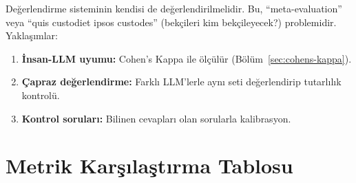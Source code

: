 De\u{g}erlendirme sisteminin kendisi de de\u{g}erlendirilmelidir. Bu, ``meta-evaluation'' veya ``quis custodiet ipsos custodes'' (bek\c{c}ileri kim bek\c{c}ileyecek?) problemidir. Yakla\c{s}{\i}mlar:

\begin{enumerate}
  \item \textbf{\.{I}nsan-LLM uyumu:} Cohen's Kappa ile \"{o}l\c{c}\"{u}l\"{u}r (B\"{o}l\"{u}m~\ref{sec:cohens-kappa}).
  \item \textbf{\c{C}apraz de\u{g}erlendirme:} Farkl{\i} LLM'lerle ayn{\i} seti de\u{g}erlendirip tutarl{\i}l{\i}k kontrol\"{u}.
  \item \textbf{Kontrol sorular{\i}:} Bilinen cevaplar{\i} olan sorularla kalibrasyon.
\end{enumerate}

\section{Metrik Kar\c{s}{\i}la\c{s}t{\i}rma Tablosu}
\label{sec:metric-comparison}

\begin{table}[H]
\centering
\caption{De\u{g}erlendirme metriklerinin kar\c{s}{\i}la\c{s}t{\i}rmas{\i}.}
\label{tab:metric-comparison}
\end{table}

